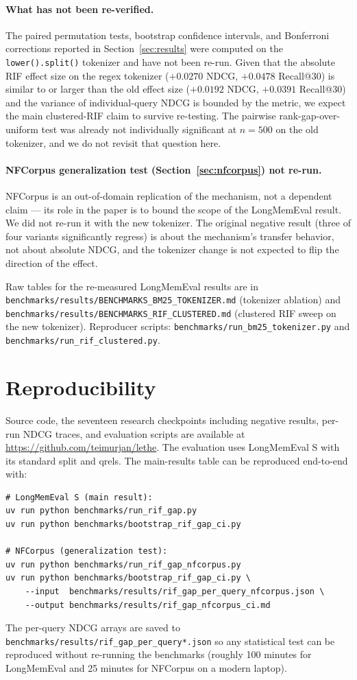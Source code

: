 \documentclass[11pt,a4paper]{article}
\begin{document}
\paragraph{What has not been re-verified.} The paired permutation tests, bootstrap confidence intervals, and Bonferroni corrections reported in Section~\ref{sec:results} were computed on the \texttt{lower().split()} tokenizer and have not been re-run. Given that the absolute RIF effect size on the regex tokenizer ($+0.0270$ NDCG, $+0.0478$ Recall@30) is similar to or larger than the old effect size ($+0.0192$ NDCG, $+0.0391$ Recall@30) and the variance of individual-query NDCG is bounded by the metric, we expect the main clustered-RIF claim to survive re-testing. The pairwise rank-gap-over-uniform test was already not individually significant at $n=500$ on the old tokenizer, and we do not revisit that question here.

\paragraph{NFCorpus generalization test (Section~\ref{sec:nfcorpus}) not re-run.} NFCorpus is an out-of-domain replication of the mechanism, not a dependent claim — its role in the paper is to bound the scope of the LongMemEval result. We did not re-run it with the new tokenizer. The original negative result (three of four variants significantly regress) is about the mechanism's transfer behavior, not about absolute NDCG, and the tokenizer change is not expected to flip the direction of the effect.

Raw tables for the re-measured LongMemEval results are in \texttt{benchmarks/results/BENCHMARKS\_BM25\_TOKENIZER.md} (tokenizer ablation) and \texttt{benchmarks/results/BENCHMARKS\_RIF\_CLUSTERED.md} (clustered RIF sweep on the new tokenizer). Reproducer scripts: \texttt{benchmarks/run\_bm25\_tokenizer.py} and \texttt{benchmarks/run\_rif\_clustered.py}.

\section*{Reproducibility}

Source code, the seventeen research checkpoints including negative results, per-run NDCG traces, and evaluation scripts are available at \url{https://github.com/teimurjan/lethe}. The evaluation uses LongMemEval S with its standard split and qrels. The main-results table can be reproduced end-to-end with:
\begin{verbatim}
# LongMemEval S (main result):
uv run python benchmarks/run_rif_gap.py
uv run python benchmarks/bootstrap_rif_gap_ci.py

# NFCorpus (generalization test):
uv run python benchmarks/run_rif_gap_nfcorpus.py
uv run python benchmarks/bootstrap_rif_gap_ci.py \
    --input  benchmarks/results/rif_gap_per_query_nfcorpus.json \
    --output benchmarks/results/rif_gap_nfcorpus_ci.md
\end{verbatim}
The per-query NDCG arrays are saved to \texttt{benchmarks/results/rif\_gap\_per\_query*.json} so any statistical test can be reproduced without re-running the benchmarks (roughly 100 minutes for LongMemEval and 25 minutes for NFCorpus on a modern laptop).
\end{document}
